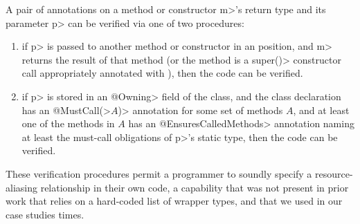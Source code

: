 A pair of \mccannot annotations on a method or constructor \<m>'s return type
and its parameter \<p> can be verified via one of two
procedures:
\begin{enumerate}
\item if \<p> is passed to another method or constructor in an
  \mccannot position, and \<m> returns the result of that method
  (or the method is a \<super()> constructor call appropriately annotated
  with \mccannot), then the code can be verified.
\item if \<p> is stored in an \<@Owning> field of the class, and the
  class declaration has an \<@MustCall(>$A$\<)> annotation for some set
  of methods $A$, and at least one of the methods in $A$ has an
  \<@EnsuresCalledMethods> annotation naming at least the
  must-call obligations of \<p>'s static type, then the code can be verified.
\end{enumerate}
These verification procedures permit a programmer to soundly specify a resource-aliasing
relationship in their own code, a capability that was not present in prior work
that relies on a hard-coded list of wrapper types, and that we used in our case studies
 times.



